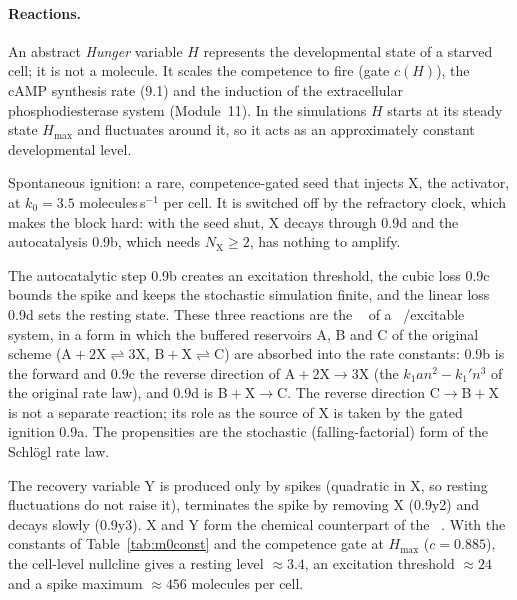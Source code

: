 \paragraph{Reactions.}
\begin{description}\itemsep0pt
\item[0.8a/b] An abstract \emph{Hunger} variable $H$ represents the developmental state of a starved cell; it is not a molecule. It scales the competence to fire (gate $c(H)$), the cAMP synthesis rate (9.1) and the induction of the extracellular phosphodiesterase system (Module~11). In the simulations $H$ starts at its steady state $H_{\max}$ and fluctuates around it, so it acts as an approximately constant developmental level.
\item[0.9a] Spontaneous ignition: a rare, competence-gated seed that injects X, the activator, at $k_0=3.5$ molecules\,s$^{-1}$ per cell. It is switched off by the refractory clock, which makes the block hard: with the seed shut, X decays through 0.9d and the autocatalysis 0.9b, which needs $N_\mathrm{X}\ge2$, has nothing to amplify.
\item[0.9b--d] The autocatalytic step 0.9b creates an excitation threshold, the cubic loss 0.9c bounds the spike and keeps the stochastic simulation finite, and the linear loss 0.9d sets the resting state. These three reactions are the ~\cite{schlogl1972} of a ~\cite{schlogl1972}/excitable system, in a form in which the buffered reservoirs A, B and C of the original scheme (A${}+2$X$\rightleftharpoons3$X, B${}+$X$\rightleftharpoons$C) are absorbed into the rate constants: 0.9b is the forward and 0.9c the reverse direction of A${}+2$X$\to3$X (the $k_1an^2-k_1'n^3$ of the original rate law), and 0.9d is B${}+$X$\to$C. The reverse direction C$\to$B${}+$X is not a separate reaction; its role as the source of X is taken by the gated ignition 0.9a. The propensities are the stochastic (falling-factorial) form of the Schl\"ogl rate law.
\item[0.9y1--3] The recovery variable Y is produced only by spikes (quadratic in X, so resting fluctuations do not raise it), terminates the spike by removing X (0.9y2) and decays slowly (0.9y3). X and Y form the chemical counterpart of the ~\cite{fitzhugh1961,nagumo1962}. With the constants of Table~\ref{tab:m0const} and the competence gate at $H_{\max}$ ($c=0.885$), the cell-level nullcline gives a resting level $\approx3.4$, an excitation threshold $\approx24$ and a spike maximum $\approx456$ molecules per cell.

\end{description}
